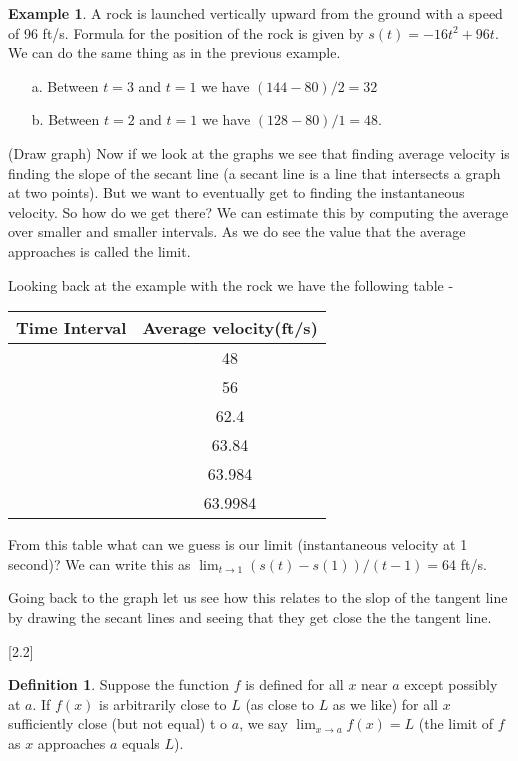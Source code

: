 \documentclass[12pt,reqno]{article}
\theoremstyle{definition}
\newtheorem*{Definition}{Definition}
\newtheorem*{Example}{Example}
\begin{document}
		\begin{Example}
		A rock is launched vertically upward from the ground with a speed of 96 ft/s. Formula for the position of the rock is given by $s(t) = -16t^2 + 96t$. We can do the same thing as in the previous example.
		
		\begin{enumerate}
			\item[a.] Between $t = 3$ and $t = 1$ we have $(144 - 80)/2 = 32$ 
			\item[b.] Between $t = 2$ and $t = 1$ we have $(128 - 80)/1 = 48$. 
		\end{enumerate} 
	\end{Example}
	(Draw graph) 
	Now if we look at the graphs we see that finding average velocity is finding the slope of the secant line (a secant line is a line that intersects a graph at two points). But we want to eventually get to finding the instantaneous velocity. So how do we get there? We can estimate this by computing the average over smaller and smaller intervals. As we do see the value that the average approaches is called the limit. 
	
	Looking back at the example with the rock we have the following table - 
	
	
	\begin{tabular}{| c | c |}
		\hline
		Time Interval & Average velocity(ft/s) \\
		\hline
		[1, 2] & 48 \\ \hline
		[1, 1.5] & 56 \\ \hline
		[1, 1.1] & 62.4 \\ \hline
		[1, 1.01] & 63.84 \\\hline
		[1, 1.001] & 63.984 \\\hline
		[1, 1.0001] & 63.9984 \\\hline
	\end{tabular}

	From this table what can we guess is our limit (instantaneous velocity at 1 second)? We can write this as $\lim_{t \to 1} (s(t) - s(1))/(t - 1) = 64$ ft/s. 
	
	Going back to the graph let us see how this relates to the slop of the tangent line by drawing the secant lines and seeing that they get close the the tangent line. 
	
	[2.2]
\begin{Definition}
	Suppose the function $f$ is defined for all $x$ near $a$ except possibly at $a$. If $f(x)$ is arbitrarily close to $L$ (as close to $L$ as we like) for all $x$ sufficiently close (but not equal) t o $a$, we say $\lim_{x \to a} f(x) = L$ (the limit of $f$ as $x$ approaches $a$ equals $L$). 
\end{Definition}
\end{document}
